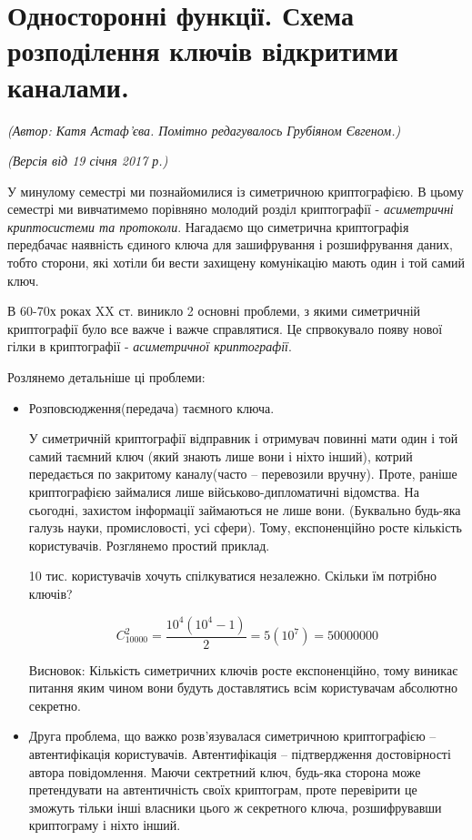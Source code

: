 \section{Односторонні функції. Схема розподілення ключів відкритими каналами.}
\begin{flushright}
\emph{(Автор: Катя Астаф'єва. Помітно редагувалось Грубіяном Євгеном.)}
\par \emph{(Версія від 19 січня 2017 р.)}
\end{flushright}

У минулому семестрі ми познайомилися із симетричною криптографією. В цьому семестрі ми вивчатимемо порівняно молодий розділ криптографії - \textit{асиметричні криптосистеми та протоколи}. Нагадаємо що симетрична криптографія передбачає наявність єдиного ключа для зашифрування і розшифрування даних, тобто сторони, які хотіли би вести захищену комунікацію мають один і той самий ключ.

В 60-70х роках XX ст. виникло 2 основні проблеми, з якими симетричній криптографії було все важче і важче справлятися. Це спрвокувало появу нової гілки в криптографії - \textit{асиметричної криптографії}. 

Розлянемо детальніше ці проблеми:
\begin{itemize}
\item Розповсюдження(передача) таємного ключа.

У симетричній криптографії відправник і отримувач повинні мати один і той самий таємний ключ (який знають лише вони і ніхто інший), котрий передається по закритому каналу(часто -- перевозили вручну). Проте, раніше криптографією займалися лише військово-дипломатичні відомства. На сьогодні, захистом інформації займаються не лише вони. (Буквально будь-яка галузь науки, промисловості, усі сфери). Тому, експоненційно росте кількість користувачів. Розглянемо простий приклад.

\begin{example}
10 тис. користувачів хочуть спілкуватися незалежно. Скільки їм потрібно ключів?

\[ C_{10000}^{2} =\frac{10^4(10^4 -1)}{2} = 5(10^7) = 50000000 \]

Висновок: Кількість симетричних ключів росте експоненційно, тому виникає питання яким чином вони будуть доставлятись всім користувачам абсолютно секретно.

\end{example}

\item Друга проблема, що важко розв’язувалася симетричною криптографією – автентифікація користувачів. Автентифікація – підтвердження достовірності автора повідомлення. Маючи сектретний ключ, будь-яка сторона може претендувати на автентичність своїх криптограм, проте перевірити це зможуть тільки інші власники цього ж секретного ключа, розшифрувавши криптограму і ніхто інший.

\end{itemize}

